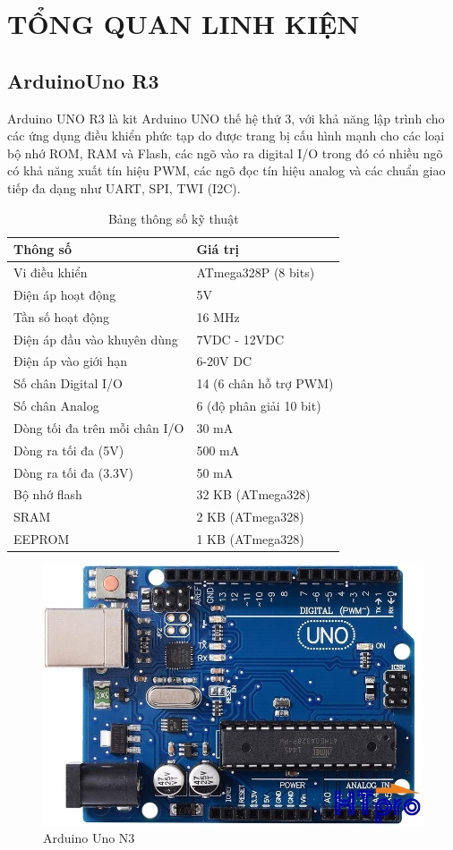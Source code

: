 \documentclass[12pt]{report}
\begin{document}
\chapter{TỔNG QUAN LINH KIỆN}

\section{ArduinoUno R3}
Arduino UNO R3 là kit Arduino UNO thế hệ thứ 3, với khả năng lập trình
cho các ứng dụng điều khiển phức tạp do được trang bị cấu hình mạnh cho các
loại bộ nhớ ROM, RAM và Flash, các ngõ vào ra digital I/O trong đó có nhiều
ngõ có khả năng xuất tín hiệu PWM, các ngõ đọc tín hiệu analog và các chuẩn
giao tiếp đa dạng như UART, SPI, TWI (I2C).


\begin{table}[H]
    \centering
    \begin{tabular}{ll} %
        \toprule %
        Thông số & Giá trị \\
        \midrule %
        Vi điều khiển & ATmega328P (8 bits) \\
        Điện áp hoạt động & 5V \\
        Tần số hoạt động & 16 MHz \\
        Điện áp đầu vào khuyên dùng & 7VDC - 12VDC \\
        Điện áp vào giới hạn & 6-20V DC \\
        Số chân Digital I/O & 14 (6 chân hỗ trợ PWM) \\
        Số chân Analog & 6 (độ phân giải 10 bit) \\
        Dòng tối đa trên mỗi chân I/O & 30 mA \\
        Dòng ra tối đa (5V) & 500 mA \\
        Dòng ra tối đa (3.3V) & 50 mA \\
        Bộ nhớ flash & 32 KB (ATmega328) \\
        SRAM & 2 KB (ATmega328) \\
        EEPROM & 1 KB (ATmega328) \\
        \bottomrule %
    \end{tabular}
    \caption{Bảng thông số kỹ thuật}
\end{table}

\begin{figure}[H]
    \centering
    \includegraphics[width=0.5\linewidth]{image/adruino.jpg}
    \caption{Arduino Uno N3}
\end{figure}
\end{document}
